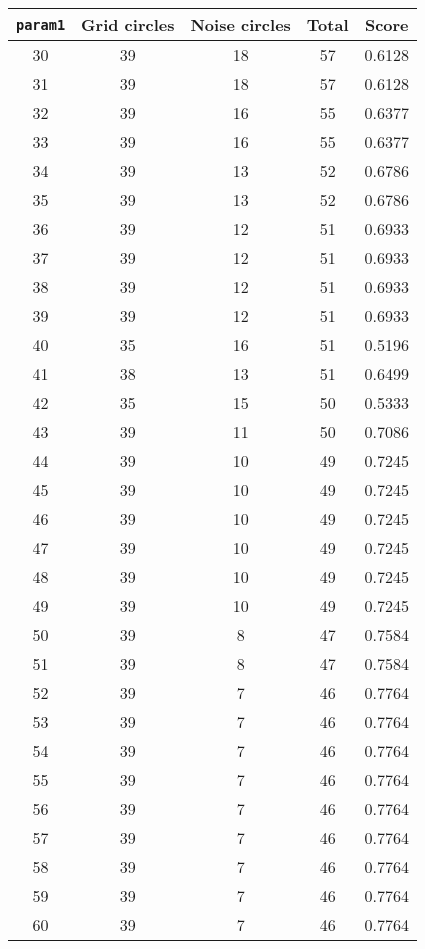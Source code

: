 \documentclass[letterpaper, 12pt]{article}
\begin{document}
\begin{longtable}{|c|c|c|c|c|}
\hline
\textbf{\texttt{param1}} & \textbf{Grid circles} & \textbf{Noise circles} & \textbf{Total} & \textbf{Score} \\
\hline
30 & 39 & 18 & 57 & 0.6128 \\
\hline
31 & 39 & 18 & 57 & 0.6128 \\
\hline
32 & 39 & 16 & 55 & 0.6377 \\
\hline
33 & 39 & 16 & 55 & 0.6377 \\
\hline
34 & 39 & 13 & 52 & 0.6786 \\
\hline
35 & 39 & 13 & 52 & 0.6786 \\
\hline
36 & 39 & 12 & 51 & 0.6933 \\
\hline
37 & 39 & 12 & 51 & 0.6933 \\
\hline
38 & 39 & 12 & 51 & 0.6933 \\
\hline
39 & 39 & 12 & 51 & 0.6933 \\
\hline
40 & 35 & 16 & 51 & 0.5196 \\
\hline
41 & 38 & 13 & 51 & 0.6499 \\
\hline
42 & 35 & 15 & 50 & 0.5333 \\
\hline
43 & 39 & 11 & 50 & 0.7086 \\
\hline
44 & 39 & 10 & 49 & 0.7245 \\
\hline
45 & 39 & 10 & 49 & 0.7245 \\
\hline
46 & 39 & 10 & 49 & 0.7245 \\
\hline
47 & 39 & 10 & 49 & 0.7245 \\
\hline
48 & 39 & 10 & 49 & 0.7245 \\
\hline
49 & 39 & 10 & 49 & 0.7245 \\
\hline
50 & 39 & 8 & 47 & 0.7584 \\
\hline
51 & 39 & 8 & 47 & 0.7584 \\
\hline
52 & 39 & 7 & 46 & 0.7764 \\
\hline
53 & 39 & 7 & 46 & 0.7764 \\
\hline
54 & 39 & 7 & 46 & 0.7764 \\
\hline
55 & 39 & 7 & 46 & 0.7764 \\
\hline
56 & 39 & 7 & 46 & 0.7764 \\
\hline
57 & 39 & 7 & 46 & 0.7764 \\
\hline
58 & 39 & 7 & 46 & 0.7764 \\
\hline
59 & 39 & 7 & 46 & 0.7764 \\
\hline
60 & 39 & 7 & 46 & 0.7764 \\

\end{longtable}
\end{document}
